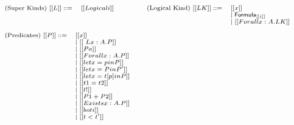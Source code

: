 \begin{center}  
  \begin{math}
    \scriptsize
    \begin{array}{llllllllllllllll}      
      \begin{array}{lll}
      \text{(Super Kinds) } [[L]] ::= & [[Logical i]]\\
      & \\
      & \\
    \end{array}
    &
    \begin{array}{lllllll}           
      \text{(Logical Kind) } [[LK]] ::= 
      & [[x]] \\
      & \mid \mathsf{Formula}_{[[i]]} \\
      & \mid [[Forall x : A.LK]]\\
    \end{array}\\
    & \\
      \begin{array}{llllll}
        \text{(Predicates) } [[P]] ::= 
        & [[x]] \\
        & \mid [[\ L x : A . P]] \\
        & \mid [[P a]] \\
        & \mid [[Forall x : A . P]] \\
        & \mid [[let x = p in P]] \\
        & \mid [[let x = P in P']] \\
        & \mid [[let x = t [ p ] in P]] \\
        & \mid [[t1 = t2]] \\
        & \mid [[t !]] \\
        & \mid [[P1 + P2]] \\
        & \mid [[Exists x : A . P]] \\
        & \mid [[bot i]] \\
        & \mid [[t < t']] \\
        & \\
        & \\
        & \\
        & \\
        & \\
        & \\        
        & \\
        & \\
      \end{array}
      &
      \begin{array}{lll}

\end{array}
\end{array}
\end{math}
\end{center}
